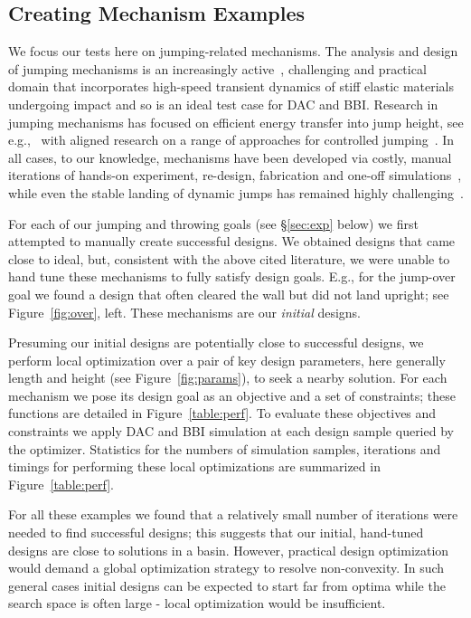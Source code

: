 \subsection{Creating Mechanism Examples} We focus our tests here on jumping-related mechanisms. The analysis and design of jumping mechanisms is an increasingly active~\cite{Anonymous:gFJEnD-w,bergbreiter2007design,Bingham:orient,Bergbreiter:2008te,Jung:2014fh,JeSungKoh:2013ga,Koh:2015cy,Vella:2015cw,ShuguangLi:2015kl}, challenging and practical domain that incorporates high-speed transient dynamics of stiff elastic materials undergoing impact and so is an ideal test case for DAC and BBI.
Research in jumping mechanisms has focused on efficient energy transfer into jump height, see e.g.,~\citet{MinkyunNoh:2012fv}
with aligned research on a range of approaches for controlled jumping~\citep{Loepfe:2015ir,Bartlett:2015he,ShuguangLi:2015kl}. In all cases, to our knowledge, mechanisms have been developed via costly, manual iterations of hands-on experiment, re-design, fabrication and one-off simulations~\citep{Cho:2009jl,Bartlett:2015he}, while even the stable landing of dynamic jumps has remained highly challenging~\citep{Jung:2015gm}.

For each of our jumping and throwing goals (see \S\ref{sec:exp} below) we first attempted to manually create successful designs. We obtained designs that came close to ideal, but, consistent with the above cited literature, we were unable to hand tune these mechanisms to fully satisfy design goals. E.g., for the jump-over goal we found a design that often cleared the wall but did not land upright; see Figure~\ref{fig:over}, left. These mechanisms are our \emph{initial} designs.

Presuming our initial designs are potentially close to successful designs, we perform local optimization over a pair of key design parameters, here generally length and height (see Figure~\ref{fig:params}), to seek a nearby solution. For each mechanism we pose its design goal as an objective and a set of constraints; these functions are detailed in Figure~\ref{table:perf}. To evaluate these objectives and constraints we apply DAC and BBI simulation at each design sample queried by the optimizer. Statistics for the numbers of simulation samples, iterations and timings for performing these local optimizations are summarized in Figure~\ref{table:perf}.

For all these examples we found that a relatively small number of iterations were needed to find successful designs;  this suggests that our initial, hand-tuned designs are close to solutions in a basin. However, practical design optimization would demand a global optimization strategy to resolve non-convexity. In such general cases initial designs can be expected to start far from optima while the search space is often large - local optimization would be insufficient.

